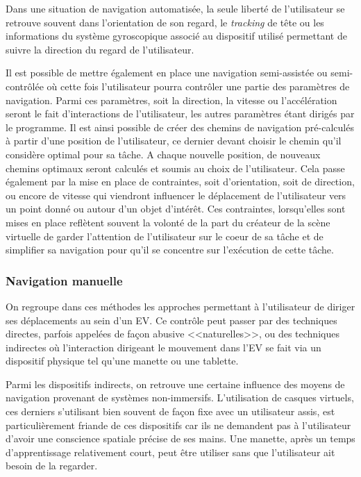 Dans une situation de navigation automatisée, la seule liberté de l'utilisateur se retrouve souvent dans l'orientation de son regard, le \textit{tracking} de tête ou les informations du système gyroscopique associé au dispositif utilisé permettant de suivre la direction du regard de l'utilisateur.

Il est possible de mettre également en place une navigation semi-assistée ou semi-contrôlée où cette fois l'utilisateur pourra contrôler une partie des paramètres de navigation. Parmi ces paramètres, soit la direction, la vitesse ou l'accélération seront le fait d'interactions de l'utilisateur, les autres paramètres étant dirigés par le programme. Il est ainsi possible de créer des chemins de navigation pré-calculés à partir d'une position de l'utilisateur, ce dernier devant choisir le chemin qu'il considère optimal pour sa tâche. A chaque nouvelle position, de nouveaux chemins optimaux seront calculés et soumis au choix de l'utilisateur.
Cela passe également par la mise en place de contraintes, soit d'orientation, soit de direction, ou encore de vitesse qui viendront influencer le déplacement de l'utilisateur vers un point donné ou autour d'un objet d'intérêt. Ces contraintes, lorsqu'elles sont mises en place reflètent souvent la volonté de la part du créateur de la scène virtuelle de garder l'attention de l'utilisateur sur le coeur de sa tâche et de simplifier sa navigation pour qu'il se concentre sur l’exécution de cette tâche.

\subsubsection{Navigation manuelle}

On regroupe dans ces méthodes les approches permettant à l'utilisateur de diriger ses déplacements au sein d'un EV. Ce contrôle peut passer par des techniques directes, parfois appelées de façon abusive <<naturelles>>, ou des techniques indirectes où l'interaction dirigeant le mouvement dans l'EV se fait via un dispositif physique tel qu'une manette ou une tablette.

Parmi les dispositifs indirects, on retrouve une certaine influence des moyens de navigation provenant de systèmes non-immersifs. L'utilisation de casques virtuels, ces derniers s'utilisant bien souvent de façon fixe avec un utilisateur assis, est particulièrement friande de ces dispositifs car ils ne demandent pas à l'utilisateur d'avoir une conscience spatiale précise de ses mains. Une manette, après un temps d'apprentissage relativement court, peut être utiliser sans que l'utilisateur ait besoin de la regarder. 

